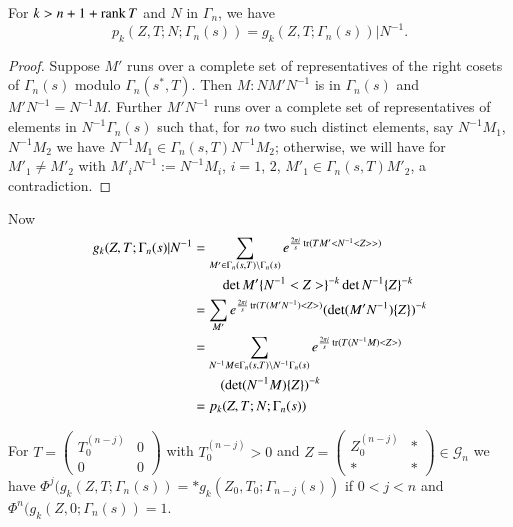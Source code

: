 \begin{sublemma}\label{c1:lem-1.6.4}
For $k>n+1+\operatorname{rank} T$ and $N$ in $\Gamma_{n}$, we have
$$
p_{k}(Z,T;N;\Gamma_{n}(s))=g_{k}(Z,T;\Gamma_{n}(s))|N^{-1}.
$$
\end{sublemma}

\begin{proof}
Suppose $M'$ runs over a complete set of representatives of the right
cosets of $\Gamma_{n}(s)$ modulo $\Gamma_{n}(s^{\ast},T)$. Then
$M:NM'N^{-1}$ is in $\Gamma_{n}(s)$ and $M'N^{-1}=N^{-1}M$. Further
$M'N^{-1}$ runs over a complete set of representatives of elements in
$N^{-1}\Gamma_{n}(s)$ such that, for {\em no} two such distinct
elements, say $N^{-1}M_{1}$, $N^{-1}M_{2}$ we have
$N^{-1}M_{1}\in\Gamma_{n}(s,T)N^{-1}M_{2}$; otherwise, we will have
for $M'_{1}\neq M'_{2}$ with $M'_{i}N^{-1}:=N^{-1}M_{i}$, $i=1$, $2$,
$M'_{1}\in\Gamma_{n}(s,T)M'_{2}$, a contradiction. 
\end{proof}

Now\pageoriginale
\begin{align*}
g_{k}(Z,T;\Gamma_{n}(s)|N^{-1} &= \sum_{M'\in\Gamma_{n}(s,T)\backslash
  \Gamma_{n}(s)}e^{\frac{2\pi i}{s}\operatorname{tr}(TM'<N^{-1}<Z>>)}\\
&\qquad\det M'\{N^{-1}<Z>\}^{-k}\det N^{-1}\{Z\}^{-k}\\
&= \sum_{M'}e^{\frac{2\pi i}{s}\operatorname{tr}(T(M'N^{-1})<Z>)}(\det
(M'N^{-1})\{Z\})^{-k}\\
&= \sum_{N^{-1}M\in\Gamma_{n}(s,T)\backslash
  N^{-1}\Gamma_{n}(s)}e^{\frac{2\pi
    i}{s}\operatorname{tr}(T(N^{-1}M)<Z>)}\\
&\qquad(\det(N^{-1}M)\{Z\})^{-k}\\
&= p_{k}(Z,T;N;\Gamma_{n}(s))
\end{align*}

\begin{sublemma}\label{c1:lem-1.6.5}
For $T=\left(\begin{smallmatrix} T_{0}^{(n-j)} & 0\\ 0 & 0
\end{smallmatrix}\right)$ with $T_{0}^{(n-j)}>0$ and
$Z=\left(\begin{smallmatrix} Z_{0}^{(n-j)} & \ast\\ \ast & \ast
\end{smallmatrix}\right)\in\mathscr{G}_{n}$ we have
$\Phi^{j}(g_{k}(Z,T;\Gamma_{n}(s))=\ast
g_{k}(Z_{0},T_{0};\Gamma_{n-j}(s))$ if $0<j<n$ and
$\Phi^{n}(g_{k}(Z,0;\Gamma_{n}(s))=1$. 
\end{sublemma}

